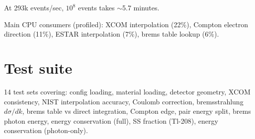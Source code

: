 \documentclass{article}
\begin{document}
At 293k events/sec, $10^8$ events takes $\sim$5.7 minutes.

Main CPU consumers (profiled): XCOM interpolation (22\%), Compton electron direction (11\%), ESTAR interpolation (7\%), brems table lookup (6\%).

\section{Test suite}

14 test sets covering: config loading, material loading, detector geometry, XCOM consistency, NIST interpolation accuracy, Coulomb correction, bremsstrahlung $d\sigma/dk$, brems table vs direct integration, Compton edge, pair energy split, brems photon energy, energy conservation (full), SS fraction (Tl-208), energy conservation (photon-only).
\end{document}
